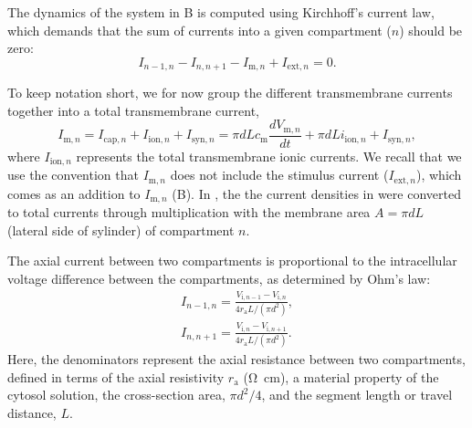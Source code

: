 The dynamics of the system in B  is computed using Kirchhoff's current law, which demands that the sum of currents into a given compartment ($n$) should be zero:
\begin{equation}
I_{n-1,n} - I_{n,n+1} - I_{\mathrm{m},n} + I_{\mathrm{ext},n} = 0.
\label{eq:Neuron:Kirch}
\end{equation}

To keep notation short, we for now group the different transmembrane currents together into a total transmembrane current,
\begin{equation}
I_{\mathrm{m},n} = I_{\mathrm{cap},n} + I_{\mathrm{ion},n} + I_{\mathrm{syn},n} = \pi d L c_\text{m} \frac{dV_{\mathrm{m},n}}{dt} + \pi d L i_{\mathrm{ion},n}  + I_{\mathrm{syn},n}, 
\label{eq:Neuron:Imemb}
\end{equation}
where $I_{\mathrm{ion},n}$ represents the total transmembrane ionic currents. We recall that we use the convention that $I_{\mathrm{m},n}$ does not include the stimulus current ($I_{\mathrm{ext},n}$), which comes as an addition to $I_{\mathrm{m},n}$ (B). In , the the current densities in  were converted to total currents through multiplication with the membrane area $A=\pi d L$ (lateral side of sylinder) of compartment $n$.

The axial current between two compartments is proportional to the intracellular voltage difference between the compartments, as determined by Ohm's law:
\begin{eqnarray}
I_{n-1,n} = \frac{V_{\mathrm{i},n-1}-V_{\mathrm{i},n}}{4 r_\text{a} L/(\pi d^2)}, \nonumber \\ 
I_{n,n+1} = \frac{V_{\mathrm{i},n}-V_{\mathrm{i},n+1}}{4 r_\text{a} L/(\pi d^2)}.
\label{eq:Neuron:axialcurrents}
\end{eqnarray}
Here, the denominators represent the axial resistance between two compartments, defined in terms of the axial resistivity $r_\text{a}$ (\si{\ohm\centi\metre}), a material property of the cytosol solution, the cross-section area, $\pi d^2/4$, and the segment length or travel distance, $L$. 

